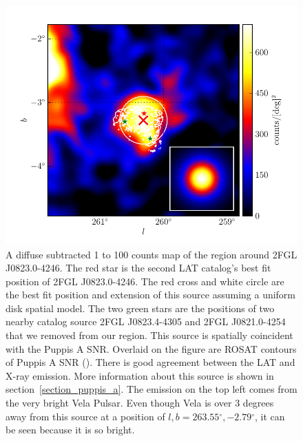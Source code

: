\documentclass[12pt,preprint]{aastex}
\newcommand{\gev}{\text{GeV}\xspace}
\renewcommand{\deg}{\ensuremath{^\circ}\xspace}
\begin{document}
\begin{figure}
  \begin{center}
    \includegraphics[type=pdf,ext=.pdf,read=.pdf]{source_plots/source_1FGL_J0823.3-4248}
  \end{center}
  \caption{A diffuse subtracted 1 \gev to 100 \gev counts map of the
  region around 2FGL J0823.0-4246. The red star is the second LAT
  catalog's best fit position of 2FGL J0823.0-4246.  The red cross
  and white circle are the best fit position and extension of this
  source assuming a uniform disk spatial model.  The two green stars
  are the positions of two nearby catalog source 2FGL J0823.4-4305 and
  2FGL J0821.0-4254 that we removed from our region. This source is
  spatially coincident with the Puppis A SNR. Overlaid on the figure are
  ROSAT contours of Puppis A SNR (\cite{rosat_puppis_a}). There is good
  agreement between the LAT and X-ray emission.  More information about
  this source is shown in section~\ref{section_puppis_a}.  The emission
  on the top left comes from the very bright Vela Pulsar. Even though
  Vela is over 3 degrees away from this source at a position of
  $l,b=263.55\deg,-2.79\deg$, it can be seen because it is so bright.
  }\label{1FGL_J0823.3-4248}
\end{figure}
\end{document}
